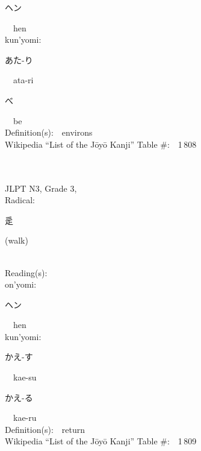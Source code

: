 \begin{multicols}{2}
{\hspace*{2em}}{\begin{CJK}{UTF8}{min} ヘン \end{CJK}}\ \ hen\ \ \\
{\hspace*{1em}}kun'yomi:\ \ \\
{\hspace*{2em}}{\begin{CJK}{UTF8}{min} あた-り \end{CJK}}\ \ ata-ri\ \ \\
{\hspace*{2em}}{\begin{CJK}{UTF8}{min} べ \end{CJK}}\ \ be\ \ \\
Definition(s):\ \ environs \\
Wikipedia ``List of the J\=oy\=o Kanji'' Table \#:\ \ 1\,808 \\
\ \ \\
{\fontsize{34pt}{40pt}  }\ \ \\  %
{JLPT N3, Grade 3, \\Radical:\ \ {\begin{CJK}{UTF8}{min} 辵 \end{CJK}} (walk) } \\
Reading(s):\ \ \\
{\hspace*{1em}}on'yomi:\ \ \\
{\hspace*{2em}}{\begin{CJK}{UTF8}{min} ヘン \end{CJK}}\ \ hen\ \ \\
{\hspace*{1em}}kun'yomi:\ \ \\
{\hspace*{2em}}{\begin{CJK}{UTF8}{min} かえ-す \end{CJK}}\ \ kae-su\ \ \\
{\hspace*{2em}}{\begin{CJK}{UTF8}{min} かえ-る \end{CJK}}\ \ kae-ru\ \ \\
Definition(s):\ \ return \\
Wikipedia ``List of the J\=oy\=o Kanji'' Table \#:\ \ 1\,809 \\

\end{multicols}
